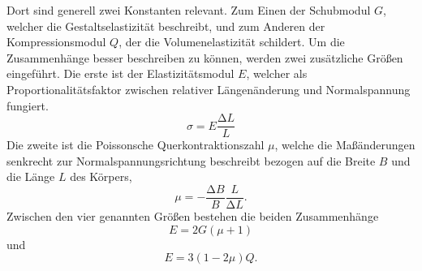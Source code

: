 Dort sind generell zwei Konstanten relevant.
Zum Einen der Schubmodul $G$, welcher die Gestaltselastizität beschreibt, und zum Anderen der Kompressionsmodul $Q$, der die Volumenelastizität schildert.
Um die Zusammenhänge besser beschreiben zu können, werden zwei zusätzliche Größen eingeführt.
Die erste ist der Elastizitätsmodul $E$, welcher als Proportionalitätsfaktor zwischen relativer Längenänderung und Normalspannung fungiert.
\begin{equation}
  \sigma = E \frac{\increment L}{L}
\end{equation}
Die zweite ist die Poissonsche Querkontraktionszahl $\mu$, welche die Maßänderungen senkrecht zur Normalspannungsrichtung beschreibt bezogen auf die Breite $B$ und die Länge $L$ des Körpers,
\begin{equation}
  \mu = - \frac{\increment B}{B} \frac{L}{\increment L}.
\end{equation}
Zwischen den vier genannten Größen bestehen die beiden Zusammenhänge
\begin{equation}
  E = 2G(\mu+1) \label{eqn:1}
\end{equation}
und
\begin{equation}
  E = 3(1-2\mu)Q. \label{eqn:2}    %
\end{equation}
